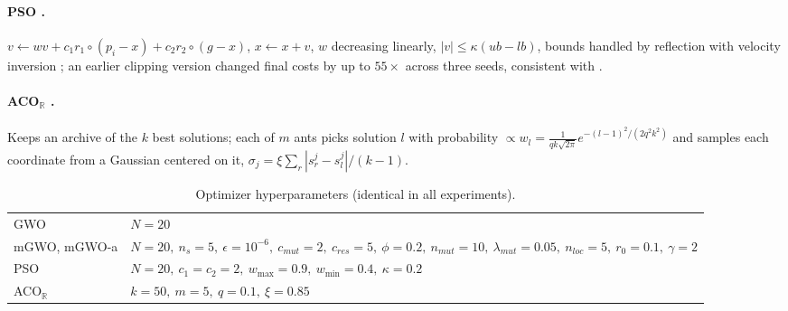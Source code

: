 \documentclass[10pt,journal,compsoc]{IEEEtran}
\newcommand{\mgwo}{mGWO}
\newcommand{\mgwoa}{mGWO-a}
\newcommand{\acor}{ACO$_\mathbb{R}$}
\begin{document}
\paragraph{PSO \cite{kennedy1995,shi1998}.} $v\leftarrow wv+c_1r_1\circ(p_i-x)+c_2r_2\circ(g-x)$, $x\leftarrow x+v$, $w$ decreasing linearly, $|v|\le\kappa(ub-lb)$, bounds handled by reflection with velocity inversion \cite{clerc2002}; an earlier clipping version changed final costs by up to $55\times$ across three seeds, consistent with \cite{helwig2013}.

\paragraph{\acor{} \cite{socha2008,dorigo1997}.} Keeps an archive of the $k$ best solutions; each of $m$ ants picks solution $l$ with probability $\propto w_l=\frac{1}{qk\sqrt{2\pi}}e^{-(l-1)^2/(2q^2k^2)}$ and samples each coordinate from a Gaussian centered on it, $\sigma_j=\xi\sum_r|s_r^j-s_l^j|/(k-1)$.

\begin{table}[t]
\centering\footnotesize
\caption{Optimizer hyperparameters (identical in all experiments).}
\label{tab:hyper}
\begin{tabular}{ll}
\toprule
GWO & $N=20$\\
\mgwo{}, \mgwoa{} & $N=20,\ n_s=5,\ \epsilon=10^{-6},\ c_{mut}=2,\ c_{res}=5,\ \phi=0.2,\ n_{mut}=10,\ \lambda_{mut}=0.05,\ n_{loc}=5,\ r_0=0.1,\ \gamma=2$\\
PSO & $N=20,\ c_1=c_2=2,\ w_{\max}=0.9,\ w_{\min}=0.4,\ \kappa=0.2$\\
\acor{} & $k=50,\ m=5,\ q=0.1,\ \xi=0.85$\\
\bottomrule
\end{tabular}
\end{table}
\end{document}
